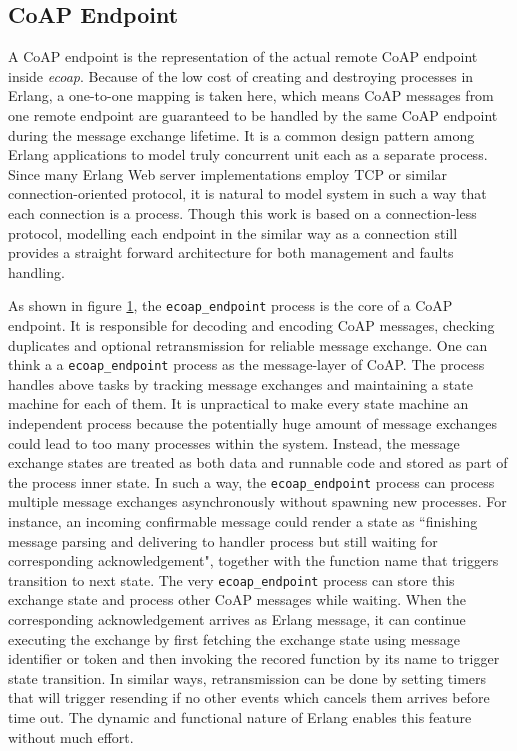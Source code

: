 \subsection{CoAP Endpoint}

A CoAP endpoint is the representation of the actual remote CoAP endpoint inside \textit{ecoap}. Because of the low cost of creating and destroying processes in Erlang, a one-to-one mapping is taken here, which means CoAP messages from one remote endpoint are guaranteed to be handled by the same CoAP endpoint during the message exchange lifetime. It is a common design pattern among Erlang applications to model truly concurrent unit each as a separate process. Since many Erlang Web server implementations employ TCP or similar connection-oriented protocol, it is natural to model system in such a way that each connection is a process. Though this work is based on a connection-less protocol, modelling each endpoint in the similar way as a connection still provides a straight forward architecture for both management and faults handling.

\begin{figure}
\label{fig:coap_endpoint}
\end{figure}

\begin{figure}
\label{fig:example_exchange_state_machine}
\end{figure}

As shown in figure \ref{fig:coap_endpoint}, the \verb|ecoap_endpoint| process is the core of a CoAP endpoint. It is responsible for decoding and encoding CoAP messages, checking duplicates and optional retransmission for reliable message exchange. One can think a a \verb|ecoap_endpoint| process as the message-layer of CoAP. The process handles above tasks by tracking message exchanges and maintaining a state machine for each of them. It is unpractical to make every state machine an independent process because the potentially huge amount of message exchanges could lead to too many processes within the system. Instead, the message exchange states are treated as both data and runnable code and stored as part of the process inner state. In such a way, the \verb|ecoap_endpoint| process can process multiple message exchanges asynchronously without spawning new processes. For instance, an incoming confirmable message could render a state as ``finishing message parsing and delivering to handler process but still waiting for corresponding acknowledgement", together with the function name that triggers transition to next state. The very \verb|ecoap_endpoint| process can store this exchange state and process other CoAP messages while waiting. When the corresponding acknowledgement arrives as Erlang message, it can continue executing the exchange by first fetching the exchange state using message identifier or token and then invoking the recored function by its name to trigger state transition. In similar ways, retransmission can be done by setting timers that will trigger resending if no other events which cancels them arrives before time out. The dynamic and functional nature of Erlang enables this feature without much effort. 

